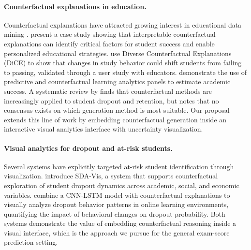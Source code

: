 \documentclass[11pt]{article}
\begin{document}

\paragraph{Counterfactual explanations in education.}
Counterfactual explanations have attracted growing interest in educational data mining \cite{bunay2026}. \citet{tsiakmaki2021} present a case study showing that interpretable counterfactual explanations can identify critical factors for student success and enable personalized educational strategies. \citet{afrin2023} use Diverse Counterfactual Explanations (DiCE) to show that changes in study behavior could shift students from failing to passing, validated through a user study with educators. \citet{susnjak2022} demonstrate the use of predictive and counterfactual learning analytics panels to estimate academic success. A systematic review by \citet{bunay2026} finds that counterfactual methods are increasingly applied to student dropout and retention, but notes that no consensus exists on which generation method is most suitable. Our proposal extends this line of work by embedding counterfactual generation inside an interactive visual analytics interface with uncertainty visualization.

\paragraph{Visual analytics for dropout and at-risk students.}
Several systems have explicitly targeted at-risk student identification through visualization. \citet{sdavis2022} introduce SDA-Vis, a system that supports counterfactual exploration of student dropout dynamics across academic, social, and economic variables. \citet{zhang2023} combine a CNN-LSTM model with counterfactual explanations to visually analyze dropout behavior patterns in online learning environments, quantifying the impact of behavioral changes on dropout probability. Both systems demonstrate the value of embedding counterfactual reasoning inside a visual interface, which is the approach we pursue for the general exam-score prediction setting.
\end{document}
